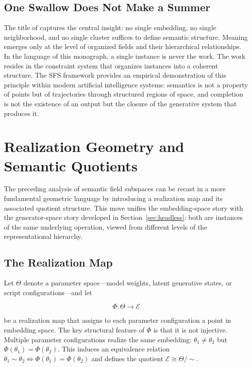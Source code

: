 \documentclass[11pt, twoside]{article}
\theoremstyle{plain}
\theoremstyle{definition}
\theoremstyle{remark}
\begin{document}
\subsection{One Swallow Does Not Make a Summer}

The title of \cite{sun2025swallow} captures the central insight: no single embedding, no single neighborhood, and no single cluster suffices to define semantic structure. Meaning emerges only at the level of organized fields and their hierarchical relationships. In the language of this monograph, a single instance is never the work. The work resides in the constraint system that organizes instances into a coherent structure. The SFS framework provides an empirical demonstration of this principle within modern artificial intelligence systems: semantics is not a property of points but of trajectories through structured regions of space, and completion is not the existence of an output but the closure of the generative system that produces it.

\section{Realization Geometry and Semantic Quotients}
\label{sec:realization_semantics}

The preceding analysis of semantic field subspaces can be recast in a more fundamental geometric language by introducing a realization map and its associated quotient structure. This move unifies the embedding-space story with the generator-space story developed in Section~\ref{sec:headless}: both are instances of the same underlying operation, viewed from different levels of the representational hierarchy.

\subsection{The Realization Map}

Let $\Theta$ denote a parameter space---model weights, latent generative states, or script configurations---and let

\[
\Phi : \Theta \to \mathcal{E}
\]

be a realization map that assigns to each parameter configuration a point in embedding space. The key structural feature of $\Phi$ is that it is not injective. Multiple parameter configurations realize the same embedding: $\theta_1 \neq \theta_2$ but $\Phi(\theta_1) = \Phi(\theta_2)$. This induces an equivalence relation $\theta_1 \sim \theta_2 \iff \Phi(\theta_1) = \Phi(\theta_2)$ and defines the quotient $\mathcal{E} \cong \Theta / {\sim}$.
\end{document}

